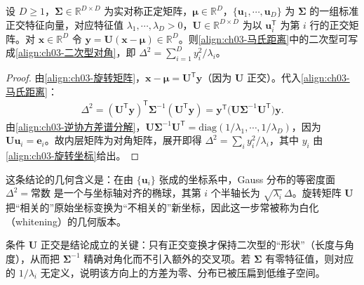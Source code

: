 \documentclass[../../main.tex]{subfiles}
\begin{document}
\begin{proposition}[二次型的对角化]\label{proposition:ch03-二次型对角化}
设 $D\geqslant1$，$\boldsymbol{\Sigma}\in\mathbb{R}^{D\times D}$ 为实对称正定矩阵，$\boldsymbol{\mu}\in\mathbb{R}^{D}$，$\{\boldsymbol{u}_1,\cdots,\boldsymbol{u}_D\}$ 为 $\boldsymbol{\Sigma}$ 的一组标准正交特征向量，对应特征值 $\lambda_1,\cdots,\lambda_D>0$，$\boldsymbol{U}\in\mathbb{R}^{D\times D}$ 为以 $\boldsymbol{u}_i^{\mathsf{T}}$ 为第 $i$ 行的正交矩阵。对 $\boldsymbol{x}\in\mathbb{R}^{D}$ 令 $\boldsymbol{y}=\boldsymbol{U}(\boldsymbol{x}-\boldsymbol{\mu})\in\mathbb{R}^{D}$。则\eqref{align:ch03-马氏距离}中的二次型可写成\eqref{align:ch03-二次型对角}，即 $\Delta^{2}=\sum_{i=1}^{D}y_i^{2}/\lambda_i$。
\end{proposition}
\begin{proof}
由\eqref{align:ch03-旋转矩阵}，$\boldsymbol{x}-\boldsymbol{\mu}=\boldsymbol{U}^{\mathsf{T}}\boldsymbol{y}$（因为 $\boldsymbol{U}$ 正交）。代入\eqref{align:ch03-马氏距离}：
\begin{align*}
\Delta^{2}=(\boldsymbol{U}^{\mathsf{T}}\boldsymbol{y})^{\mathsf{T}}\boldsymbol{\Sigma}^{-1}(\boldsymbol{U}^{\mathsf{T}}\boldsymbol{y})=\boldsymbol{y}^{\mathsf{T}}\bigl(\boldsymbol{U}\boldsymbol{\Sigma}^{-1}\boldsymbol{U}^{\mathsf{T}}\bigr)\boldsymbol{y}.
\end{align*}
由\eqref{align:ch03-逆协方差谱分解}，$\boldsymbol{U}\boldsymbol{\Sigma}^{-1}\boldsymbol{U}^{\mathsf{T}}=\mathrm{diag}(1/\lambda_1,\cdots,1/\lambda_D)$，因为 $\boldsymbol{U}\boldsymbol{u}_i=\boldsymbol{e}_i$。故内层矩阵为对角矩阵，展开即得 $\Delta^{2}=\sum_i y_i^{2}/\lambda_i$，其中 $y_i$ 由\eqref{align:ch03-旋转坐标}给出。
\end{proof}

\begin{remark}
这条结论的几何含义是：在由 $\{\boldsymbol{u}_i\}$ 张成的坐标系中，Gauss 分布的等密度面 $\Delta^{2}=\text{常数}$ 是一个与坐标轴对齐的椭球，其第 $i$ 个半轴长为 $\sqrt{\lambda_i}\,\Delta$。旋转矩阵 $\boldsymbol{U}$ 把“相关的”原始坐标变换为“不相关的”新坐标，因此这一步常被称为白化（whitening）的几何版本。

条件 $\boldsymbol{U}$ 正交是结论成立的关键：只有正交变换才保持二次型的“形状”（长度与角度），从而把 $\boldsymbol{\Sigma}^{-1}$ 精确对角化而不引入额外的交叉项。若 $\boldsymbol{\Sigma}$ 有零特征值，则对应的 $1/\lambda_i$ 无定义，说明该方向上的方差为零、分布已被压扁到低维子空间。
\end{remark}
\end{document}
